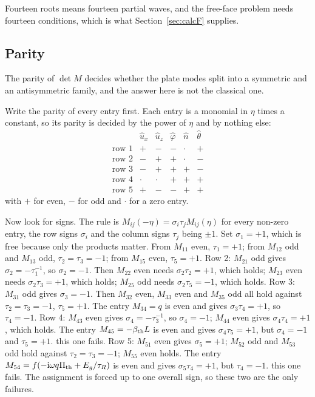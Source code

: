 \documentclass[11pt]{article}
\makeatletter
\newif\ifshowworked
\newenvironment{worked}{%
  \ifshowworked\par\smallskip\noindent\textit{Working.}\par\smallskip\else
  \setbox\z@\vbox\bgroup\fi}{\ifshowworked\par\smallskip\else\egroup\fi}
\newcommand{\ii}{\mathrm{i}}
\makeatother
\begin{document}
Fourteen roots means fourteen partial waves, and the free-face problem needs fourteen conditions, which is
what Section~\ref{sec:calcF} supplies.

\subsection*{Parity}

The parity of $\det M$ decides whether the plate modes split into a symmetric and an antisymmetric family,
and the answer here is not the classical one.

Write the parity of every entry first. Each entry is a monomial in $\eta$ times a constant, so its parity
is decided by the power of $\eta$ and by nothing else:
\begin{equation}
\begin{array}{c|ccccc}
 & \hat u_x & \hat u_z & \hat\varphi & \hat n & \hat\theta\\\hline
\text{row 1} & + & - & - & \cdot & +\\
\text{row 2} & - & + & + & \cdot & -\\
\text{row 3} & - & + & + & + & -\\
\text{row 4} & \cdot & \cdot & + & + & +\\
\text{row 5} & + & - & - & + & +
\end{array}
\label{eq:paritytable}
\end{equation}
with $+$ for even, $-$ for odd and $\cdot$ for a zero entry.

\begin{worked}
Now look for signs. The rule is $M_{ij}(-\eta)=\sigma_i\tau_jM_{ij}(\eta)$ for every non-zero entry, the
row signs $\sigma_i$ and the column signs $\tau_j$ being $\pm1$.
Set $\sigma_1=+1$, which is free because only the products matter. From $M_{11}$ even, $\tau_1=+1$; from
$M_{12}$ odd and $M_{13}$ odd, $\tau_2=\tau_3=-1$; from $M_{15}$ even, $\tau_5=+1$.
Row 2: $M_{21}$ odd gives $\sigma_2=-\tau_1^{-1}$, so $\sigma_2=-1$. Then $M_{22}$ even needs
$\sigma_2\tau_2=+1$, which holds; $M_{23}$ even needs $\sigma_2\tau_3=+1$, which holds; $M_{25}$ odd needs
$\sigma_2\tau_5=-1$, which holds.
Row 3: $M_{31}$ odd gives $\sigma_3=-1$. Then $M_{32}$ even, $M_{33}$ even and $M_{35}$ odd all hold
against $\tau_2=\tau_3=-1$, $\tau_5=+1$. The entry $M_{34}=q$ is even and gives $\sigma_3\tau_4=+1$, so
$\tau_4=-1$.
Row 4: $M_{43}$ even gives $\sigma_4=-\tau_3^{-1}$, so $\sigma_4=-1$; $M_{44}$ even gives
$\sigma_4\tau_4=+1$, which holds. The entry $M_{45}=-\beta_{\rm th}L$ is even and gives
$\sigma_4\tau_5=+1$, but $\sigma_4=-1$ and $\tau_5=+1$. this one fails.
Row 5: $M_{51}$ even gives $\sigma_5=+1$; $M_{52}$ odd and $M_{53}$ odd hold against $\tau_2=\tau_3=-1$;
$M_{55}$ even holds. The entry $M_{54}=f(-\ii\omega q\Pi_{\rm th}+E_g/\tau_R)$ is even and gives
$\sigma_5\tau_4=+1$, but $\tau_4=-1$. this one fails.
The assignment is forced up to one overall sign, so these two are the only failures.
\end{worked}
\end{document}

